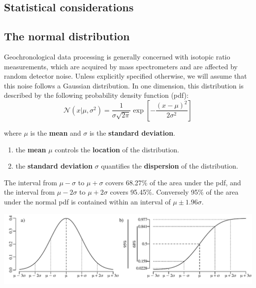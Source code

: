 \begin{refsection}
\chapter{Statistical considerations}
\label{ch:statistics}

\section{The normal distribution}
\label{sec:Gauss}

Geochronological data processing is generally concerned with isotopic
ratio measurements, which are acquired by mass spectrometers and are
affected by random detector noise. Unless explicitly specified
otherwise, we will assume that this noise follows a Gaussian
distribution. In one dimension, this distribution is described by the
following probability density function (pdf):
\begin{equation}
  \mathcal{N}(x|\mu,\sigma^2) = \frac{1}{\sigma\sqrt{2\pi}}
  \exp\!\left[-\frac{(x-\mu)^2}{2\sigma^2}\right]
  \label{eq:gauss}
\end{equation}

\noindent where $\mu$ is the \textbf{mean} and $\sigma$ is the
\textbf{standard deviation}.

\begin{enumerate}
\item the \textbf{mean} $\mu$ controls the \textbf{location} of the
  distribution.
\item the \textbf{standard deviation} $\sigma$ quantifies the
  \textbf{dispersion} of the distribution.
\end{enumerate}

The interval from $\mu-\sigma$ to $\mu+\sigma$ covers 68.27\% of the
area under the pdf, and the interval from $\mu-2\sigma$ to
$\mu+2\sigma$ covers 95.45\%. Conversely 95\% of the area under the
normal pdf is contained within an interval of $\mu\pm{1.96}\sigma$.

\noindent\includegraphics[width=\textwidth]{../figures/2sigma.pdf}
\begingroup {}
\label{fig:2sigma}
\endgroup


\end{refsection}
